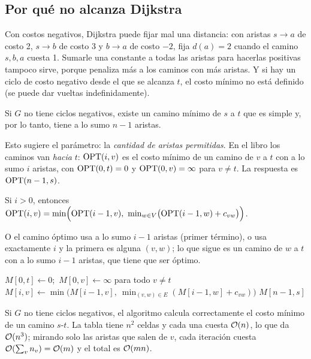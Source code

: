 \subsection{Por qué no alcanza Dijkstra}

Con costos negativos, Dijkstra puede fijar mal una distancia: con aristas
$s\to a$ de costo 2, $s\to b$ de costo 3 y $b\to a$ de costo $-2$, fija
$d(a)=2$ cuando el camino $s,b,a$ cuesta 1. Sumarle una constante a todas las
aristas para hacerlas positivas tampoco sirve, porque penaliza más a los
caminos con más aristas. Y si hay un ciclo de costo negativo desde el que se
alcanza $t$, el costo mínimo no está definido (se puede dar vueltas
indefinidamente).

\begin{resultado}[(6.22)]
Si $G$ no tiene ciclos negativos, existe un camino mínimo de $s$ a $t$ que es
simple y, por lo tanto, tiene a lo sumo $n-1$ aristas.
\end{resultado}

Esto sugiere el parámetro: la \emph{cantidad de aristas permitidas}. En el
libro los caminos van \emph{hacia} $t$: $\mathrm{OPT}(i,v)$ es el costo mínimo de un
camino de $v$ a $t$ con a lo sumo $i$ aristas, con $\mathrm{OPT}(0,t)=0$ y
$\mathrm{OPT}(0,v)=\infty$ para $v\ne t$. La respuesta es $\mathrm{OPT}(n-1,s)$.

\begin{resultado}[(6.23)]
Si $i>0$, entonces
$\OPT(i,v)=\min\Bigl(\OPT(i-1,v),\ \min_{w\in V}\bigl(\OPT(i-1,w)+c_{vw}\bigr)\Bigr)$.
\end{resultado}

O el camino óptimo usa a lo sumo $i-1$ aristas (primer término), o usa
exactamente $i$ y la primera es alguna $(v,w)$; lo que sigue es un camino de
$w$ a $t$ con a lo sumo $i-1$ aristas, que tiene que ser óptimo.

\begin{algorithmic}[1]
\State $M[0,t]\gets0$;\ $M[0,v]\gets\infty$ para todo $v\ne t$
    \State $M[i,v]\gets\min\bigl(M[i-1,v],\ \min_{(v,w)\in E}(M[i-1,w]+c_{vw})\bigr)$
  \EndFor
\EndFor
\State \Return $M[n-1,s]$
\end{algorithmic}

\begin{resultado}[(6.24) y (6.25)]
Si $G$ no tiene ciclos negativos, el algoritmo calcula correctamente el
costo mínimo de un camino $s$-$t$. La tabla tiene $n^2$ celdas y cada una
cuesta $\mathcal{O}(n)$, lo que da $\mathcal{O}(n^3)$; mirando solo las aristas que salen de
$v$, cada iteración cuesta $\mathcal{O}(\sum_vn_v)=\mathcal{O}(m)$ y el total es $\mathcal{O}(mn)$.
\end{resultado}

